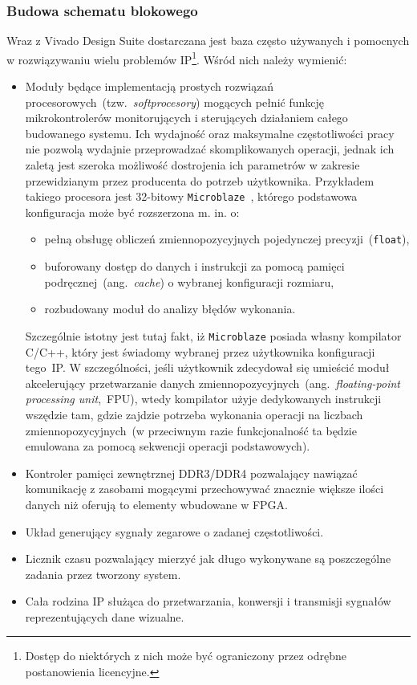 \subsubsection{Budowa schematu blokowego}
Wraz z Vivado Design Suite dostarczana jest baza często używanych i pomocnych w rozwiązywaniu wielu problemów IP\footnote{Dostęp do niektórych z nich może być ograniczony przez odrębne postanowienia licencyjne.}. Wśród nich należy wymienić:
\begin{itemize}
\item Moduły będące implementacją prostych rozwiązań procesorowych~(tzw.~\textit{softprocesory}) mogących pełnić funkcję mikrokontrolerów monitorujących i sterujących działaniem całego budowanego systemu. Ich wydajność oraz maksymalne częstotliwości pracy nie pozwolą wydajnie przeprowadzać skomplikowanych operacji, jednak ich zaletą jest szeroka możliwość dostrojenia ich parametrów w zakresie przewidzianym przez producenta do potrzeb użytkownika. Przykładem takiego procesora jest 32-bitowy  \texttt{Microblaze}~\cite{MB_QUICK}\cite{MB_UG984}, którego podstawowa konfiguracja może być rozszerzona m. in. o:
\begin{itemize}
\item pełną obsługę obliczeń zmiennopozycyjnych pojedynczej precyzji~(\texttt{float}),
\item buforowany dostęp do danych i instrukcji za pomocą pamięci podręcznej~(ang.~\textit{cache}) o wybranej konfiguracji rozmiaru,
\item rozbudowany moduł do analizy błędów wykonania.
\end{itemize}
Szczególnie istotny jest tutaj fakt, iż \texttt{Microblaze} posiada własny kompilator C/C++, który jest świadomy wybranej przez użytkownika konfiguracji tego~IP. W szczególności, jeśli użytkownik zdecydował się umieścić moduł akcelerujący przetwarzanie danych zmiennopozycyjnych~(ang.~\textit{floating-point processing unit},~FPU), wtedy kompilator użyje dedykowanych instrukcji wszędzie tam, gdzie zajdzie potrzeba wykonania operacji na liczbach zmiennopozycyjnych~(w przeciwnym razie funkcjonalność ta będzie emulowana za pomocą sekwencji operacji podstawowych).
\item Kontroler pamięci zewnętrznej DDR3/DDR4 pozwalający nawiązać komunikację z zasobami mogącymi przechowywać znacznie większe ilości danych niż oferują to elementy wbudowane w FPGA.
\item Układ generujący sygnały zegarowe o zadanej częstotliwości.
\item Licznik czasu pozwalający mierzyć jak długo wykonywane są poszczególne zadania przez tworzony system.
\item Cała rodzina IP służąca do przetwarzania, konwersji i transmisji sygnałów reprezentujących dane wizualne.
\end{itemize}
